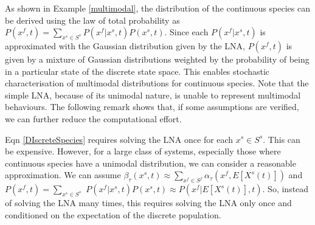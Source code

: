 \documentclass{llncs}
\begin{document}
As shown in Example \ref{multimodal}, the distribution of the continuous species can be derived using the law of total probability as $P(x^f,t)=\sum_{x^s \in S^s}P(x^f|x^s,t)P(x^s,t)$. Since each $P(x^f|x^s,t)$ is approximated with the Gaussian distribution given by the LNA, $P(x^f,t)$ is given by a mixture of Gaussian distributions weighted by the probability of being in a particular state of the discrete state space. This enables stochastic characterisation of multimodal distributions for continuous species. Note that the simple LNA, because of its unimodal nature, is unable to represent multimodal behaviours. The following remark shows that, if some assumptions are verified, we can further reduce the computational effort. %
\begin{remark}\label{red}
Eqn \eqref{DIscreteSpecies} requires solving the LNA once for each $x^s \in S^s$. 
This can be expensive. However, for a large class of systems, especially those where continuous species have a unimodal distribution, we can consider a reasonable approximation. We can assume $\beta_{\tau}(x^s,t)\approx \sum_{x^f \in S^f} \alpha_{\tau}(x^f,E[X^s(t)])$ and  $P(x^f,t)=\sum_{x^s \in S^s}$ $P(x^f|x^s,t)P(x^s,t)\approx P(x^f|E[X^s(t)],t)$. So, instead of solving the LNA many times, this requires solving the LNA only once and conditioned on the expectation of the discrete population. 
\end{remark}
\end{document}
